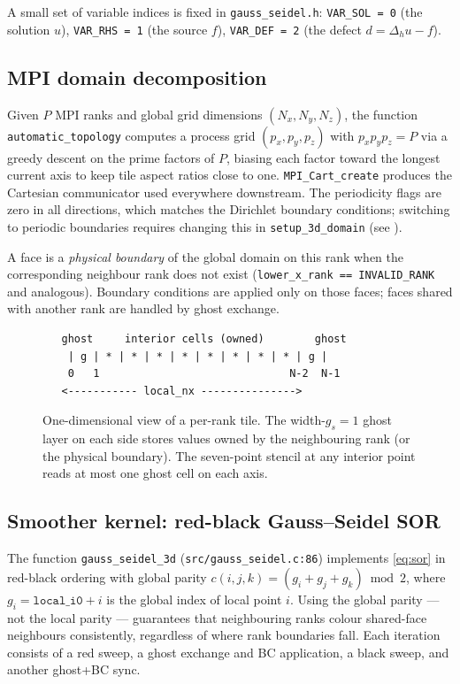 \documentclass[11pt]{article}
\theoremstyle{definition}
\begin{document}
A small set of variable indices is fixed in \texttt{gauss\_seidel.h}:
\texttt{VAR\_SOL = 0} (the solution $u$),
\texttt{VAR\_RHS = 1} (the source $f$),
\texttt{VAR\_DEF = 2} (the defect $d = \Delta_h u - f$).

\subsection{MPI domain decomposition}\label{sec:domain}
Given $P$ MPI ranks and global grid dimensions $(N_x,N_y,N_z)$, the
function \texttt{automatic\_topology} computes a process grid
$(p_x,p_y,p_z)$ with $p_x p_y p_z = P$ via a greedy descent on the
prime factors of $P$, biasing each factor toward the longest current
axis to keep tile aspect ratios close to one.  \texttt{MPI\_Cart\_create}
produces the Cartesian communicator used everywhere downstream.  The
periodicity flags are zero in all directions, which matches the
Dirichlet boundary conditions; switching to periodic
boundaries requires changing this in \texttt{setup\_3d\_domain} (see
).

A face is a \emph{physical boundary} of the global domain on this rank
when the corresponding neighbour rank does not exist
(\texttt{lower\_x\_rank == INVALID\_RANK} and analogous).  Boundary
conditions are applied only on those faces; faces shared with another
rank are handled by ghost exchange.

\begin{figure}[h]
\centering
\begin{minipage}{0.8\textwidth}
\centering
\begin{verbatim}
   ghost     interior cells (owned)        ghost
    | g | * | * | * | * | * | * | * | * | g |
    0   1                              N-2  N-1
   <----------- local_nx --------------->
\end{verbatim}
\end{minipage}
\caption{One-dimensional view of a per-rank tile.  The width-$g_s=1$
ghost layer on each side stores values owned by the neighbouring rank
(or the physical boundary).  The seven-point stencil at any interior
point reads at most one ghost cell on each axis.}\label{fig:ghost}
\end{figure}

\subsection{Smoother kernel: red-black Gauss--Seidel SOR}\label{sec:smoother-impl}
The function \texttt{gauss\_seidel\_3d} (\texttt{src/gauss\_seidel.c:86}) implements
\eqref{eq:sor} in red-black ordering with global parity
$c(i,j,k) = (g_i+g_j+g_k)\bmod 2$, where $g_i = \mathtt{local\_i0} + i$
is the global index of local point $i$.  Using the global parity --- not
the local parity --- guarantees that neighbouring ranks colour
shared-face neighbours consistently, regardless of where rank
boundaries fall.  Each iteration consists of a red sweep, a ghost
exchange and BC application, a black sweep, and another ghost+BC sync.
\end{document}
